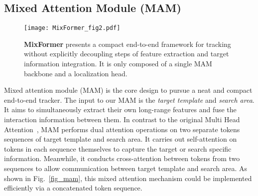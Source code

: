 \subsection{Mixed Attention Module (MAM)}
\label{sec:MAM}

\begin{figure*}[t]
\centering
\texttt{[image: MixFormer\_fig2.pdf]}
\vspace{-2mm}
\caption{{\bf MixFormer} presents a compact end-to-end framework for tracking without explicitly decoupling steps of feature extraction and target information integration. It is only composed of a single MAM backbone and a localization head.}
\label{fig_arch}
\vspace{-6mm}
\end{figure*}

Mixed attention module (MAM) is the core design to pursue a neat and compact end-to-end tracker. The input to our MAM is the {\em target template} and {\em search area}. It aims to simultaneously extract their own long-range features and fuse the interaction information between them.
In contrast to the original Multi Head Attention~\cite{transformer}, MAM performs dual attention operations on two separate tokens sequences of target template and search area. It carries out self-attention on tokens in each sequence themselves to capture the target or search specific information. Meanwhile, it conducts cross-attention between tokens from two sequences to allow communication between target template and search area. As shown in Fig.~\ref{fig_mam}, this mixed attention mechanism could be implemented efficiently via a concatenated token sequence.

